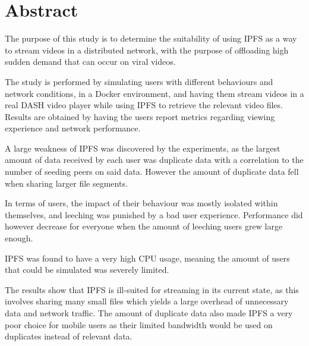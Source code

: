 \begingroup
\let\clearpage\relax
\let\cleardoublepage\relax
\let\cleardoublepage\relax

\chapter*{Abstract}
The purpose of this study is to determine the suitability of using \acs{IPFS} as a way to stream videos in a distributed network, with the purpose of offloading  high sudden demand that can occur on viral videos.

The study is performed by simulating users with different behaviours and network conditions, in a Docker environment, and having them stream videos in a real \acs{DASH} video player while using \acs{IPFS} to retrieve the relevant video files. Results are obtained by having the users report metrics regarding viewing experience and network performance.

A large weakness of \acs{IPFS} was discovered by the experiments, as the largest amount of data received by each user was duplicate data with a correlation to the number of seeding peers on said data. However the amount of duplicate data fell when sharing larger file segments.

In terms of users, the impact of their behaviour was mostly isolated within themselves, and leeching was punished by a bad user experience. Performance did however decrease for everyone when the amount of leeching users grew large enough.

\acs{IPFS} was found to have a very high \acs{CPU} usage, meaning the amount of users that could be simulated was severely limited.

The results show that \acs{IPFS} is ill-suited for streaming in its current state, as this involves sharing many small files which yields a large overhead of unnecessary data and network traffic. The amount of duplicate data also made \acs{IPFS} a very poor choice for mobile users as their limited bandwidth would be used on duplicates instead of relevant data.

\vfill

\endgroup			

\vfill